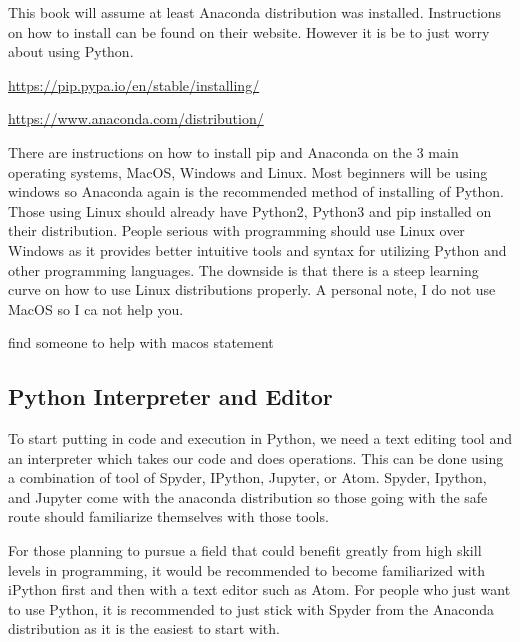 \documentclass[11pt,a4paper]{book}
\begin{document}
			This book will assume at least Anaconda distribution was installed. Instructions on how to install can be found on their website. However it is be to just worry about using Python.
			
			\url{https://pip.pypa.io/en/stable/installing/}
			
			\url{https://www.anaconda.com/distribution/}
			
			There are instructions on how to install pip and Anaconda on the 3 main operating systems, MacOS, Windows and Linux. Most beginners will be using windows so Anaconda again is the recommended method of installing of Python. Those using Linux should already have Python2, Python3 and pip installed on their distribution. People serious with programming should use Linux over Windows as it provides better intuitive tools and syntax for utilizing Python and other programming languages. The downside is that there is a steep learning curve on how to use Linux distributions properly. A personal note, I do not use MacOS so I ca not help you.
			
			find someone to help with macos statement
			
		\subsection{Python Interpreter and Editor}
			\label{subsec:Python Interpreter and Editor}
			To start putting in code and execution in Python, we need a text editing tool and an interpreter which takes our code and does operations. This can be done using a combination of tool of Spyder, IPython, Jupyter, or Atom. Spyder, Ipython, and Jupyter come with the anaconda distribution so those going with the safe route should familiarize themselves with those tools. 
			
			For those planning to pursue a field that could benefit greatly from high skill levels in programming, it would be recommended to become familiarized with iPython first and then with a text editor such as Atom. For people who just want to use Python, it is recommended to just stick with Spyder from the Anaconda distribution as it is the easiest to start with.
			
\end{document}
